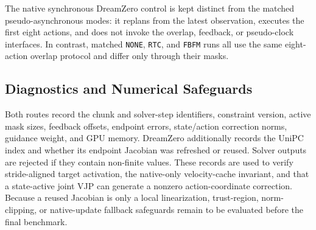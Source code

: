 The native synchronous DreamZero control is kept distinct from the matched
pseudo-asynchronous modes: it replans from the latest observation, executes the
first eight actions, and does not invoke the overlap, feedback, or pseudo-clock
interfaces. In contrast, matched \texttt{NONE}, \texttt{RTC}, and
\texttt{FBFM} runs all use the same eight-action overlap protocol and differ
only through their masks.

\subsection{Diagnostics and Numerical Safeguards}

Both routes record the chunk and solver-step identifiers, constraint version,
active mask sizes, feedback offsets, endpoint errors, state/action correction
norms, guidance weight, and GPU memory. DreamZero additionally records the
UniPC index and whether its endpoint Jacobian was refreshed or reused. Solver
outputs are rejected if they contain non-finite values. These records are used
to verify stride-aligned target activation, the native-only velocity-cache
invariant, and that a state-active joint VJP can generate a nonzero
action-coordinate correction. Because a reused Jacobian is only a local
linearization, trust-region, norm-clipping, or native-update fallback safeguards
remain to be evaluated before the final benchmark.
